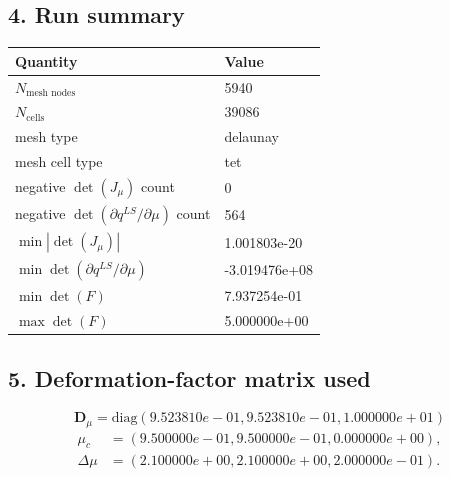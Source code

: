 \documentclass[11pt]{article}
\begin{document}
\subsection*{4. Run summary}
\begin{center}
\begin{tabular}{ll}
\toprule
Quantity & Value \\
\midrule
$N_\text{mesh nodes}$ & 5940 \\
$N_\text{cells}$ & 39086 \\
mesh type & delaunay \\
mesh cell type & tet \\
negative $\det(J_\mu)$ count & 0 \\
negative $\det(\partial q^{LS}/\partial\mu)$ count & 564 \\
$\min |\det(J_\mu)|$ & 1.001803e-20 \\
$\min\det(\partial q^{LS}/\partial\mu)$ & -3.019476e+08 \\
$\min\det(F)$ & 7.937254e-01 \\
$\max\det(F)$ & 5.000000e+00 \\
\bottomrule
\end{tabular}
\end{center}
\subsection*{5. Deformation-factor matrix used}
\begin{equation}
\mathbf{D}_{\mu}=\mathrm{diag}\left(9.523810e-01,9.523810e-01,1.000000e+01\right)\end{equation}
\begin{align}
\mu_c &= \left(9.500000e-01,9.500000e-01,0.000000e+00\right),\\
\Delta\mu &= \left(2.100000e+00,2.100000e+00,2.000000e-01\right).
\end{align}
\end{document}
